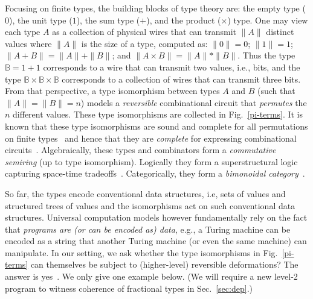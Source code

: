 \documentclass[sigplan,10pt,review,anonymous]{acmart}
\begin{document}
Focusing on finite types, the building blocks of type theory are: the
empty type ($0$), the unit type ($1$), the sum type ($+$), and the
product ($\times$) type. One may view each type $A$ as a collection of
physical wires that can transmit $\|A\|$ distinct values where $\|A\|$
is the size of a type, computed as: $\| 0 \| = 0$; $\| 1 \| = 1$;
$\| A + B \| = \| A \| + \| B \|$; and
$\| A \times B \| = \| A \| * \| B \|$. Thus the type
$\mathbb{B} = 1 + 1$ corresponds to a wire that can transmit two
values, i.e., bits, and the type
$\mathbb{B} \times \mathbb{B} \times \mathbb{B}$ corresponds to a
collection of wires that can transmit three bits. From that
perspective, a type isomorphism between types $A$ and $B$ (such that
$\|A\|=\|B\|=n$) models a \emph{reversible} combinational circuit that
\emph{permutes} the $n$ different values. These type isomorphisms are
collected in Fig.~\ref{pi-terms}. It is known that these type
isomorphisms are sound and complete for all permutations on finite
types~\cite{Fiore:2004,fiore-remarks} and hence that they are
\emph{complete} for expressing combinational
circuits~\cite{fredkin1982conservative,James:2012:IE:2103656.2103667,Toffoli:1980}. Algebraically,
these types and combinators form a \emph{commutative semiring} (up to
type isomorphism). Logically they form a superstructural logic
capturing space-time tradeoffs~\cite{superstructural}. Categorically,
they form a \emph{bimonoidal category}~\cite{laplaza72}. 

So far, the types encode conventional data structures, i.e, sets of
values and structured trees of values and the isomorphisms act on such
conventional data structures. Universal computation models however
fundamentally rely on the fact that \emph{programs are (or can be
  encoded as) data}, e.g., a Turing machine can be encoded as a string
that another Turing machine (or even the same machine) can
manipulate. In our setting, we ask whether the type isomorphisms in
Fig.~\ref{pi-terms} can themselves be subject to (higher-level)
reversible deformations? The answer is
yes~\cite{Miller:2003:TBA:775832.775915,DBLP:conf/esop/CaretteS16,DBLP:journals/corr/CockettCS17}. We
only give one example below. (We will require a new level-2 program to
witness coherence of fractional types in Sec.~\ref{sec:dep}.)
\end{document}
